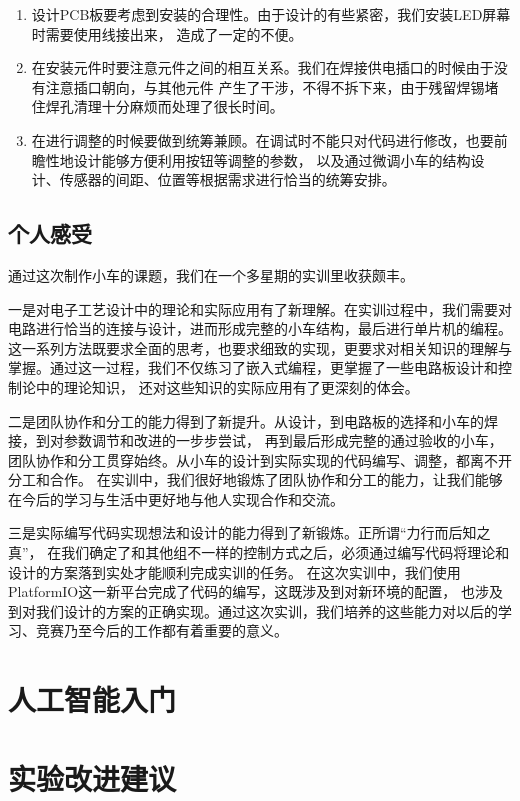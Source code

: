 \documentclass[a4paper,twoside,zihao=5,UTF8]{ctexart}
\begin{document}
\begin{spacing}{1.2}
\begin{enumerate}
	\item 设计PCB板要考虑到安装的合理性。由于设计的有些紧密，我们安装LED屏幕时需要使用线接出来，
	造成了一定的不便。

	\item 在安装元件时要注意元件之间的相互关系。我们在焊接供电插口的时候由于没有注意插口朝向，与其他元件
	产生了干涉，不得不拆下来，由于残留焊锡堵住焊孔清理十分麻烦而处理了很长时间。

	\item 在进行调整的时候要做到统筹兼顾。在调试时不能只对代码进行修改，也要前瞻性地设计能够方便利用按钮等调整的参数，
	以及通过微调小车的结构设计、传感器的间距、位置等根据需求进行恰当的统筹安排。
\end{enumerate}

\subsection{个人感受}

通过这次制作小车的课题，我们在一个多星期的实训里收获颇丰。

一是对电子工艺设计中的理论和实际应用有了新理解。在实训过程中，我们需要对电路进行恰当的连接与设计，进而形成完整的小车结构，最后进行单片机的编程。
这一系列方法既要求全面的思考，也要求细致的实现，更要求对相关知识的理解与掌握。通过这一过程，我们不仅练习了嵌入式编程，更掌握了一些电路板设计和控制论中的理论知识，
还对这些知识的实际应用有了更深刻的体会。

二是团队协作和分工的能力得到了新提升。从设计，到电路板的选择和小车的焊接，到对参数调节和改进的一步步尝试，
再到最后形成完整的通过验收的小车，团队协作和分工贯穿始终。从小车的设计到实际实现的代码编写、调整，都离不开分工和合作。
在实训中，我们很好地锻炼了团队协作和分工的能力，让我们能够在今后的学习与生活中更好地与他人实现合作和交流。

三是实际编写代码实现想法和设计的能力得到了新锻炼。正所谓“力行而后知之真”，
在我们确定了和其他组不一样的控制方式之后，必须通过编写代码将理论和设计的方案落到实处才能顺利完成实训的任务。
在这次实训中，我们使用PlatformIO这一新平台完成了代码的编写，这既涉及到对新环境的配置，
也涉及到对我们设计的方案的正确实现。通过这次实训，我们培养的这些能力对以后的学习、竞赛乃至今后的工作都有着重要的意义。


\section{人工智能入门}


\section{实验改进建议}


\end{spacing}
\end{document}
